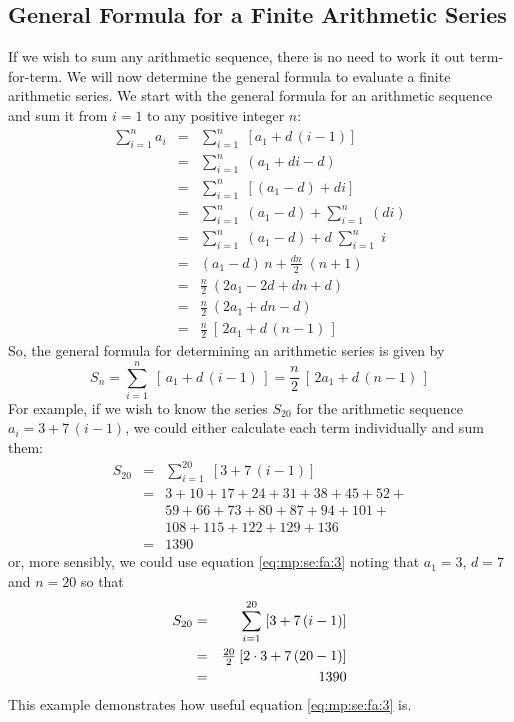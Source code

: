 \subsection{General Formula for a Finite Arithmetic Series}
If we wish to sum any arithmetic sequence, there is no need to work it out term-for-term. We will now determine the general formula to evaluate a finite arithmetic series. We start with the general formula for an arithmetic sequence and sum it from $i=1$ to any positive integer $n$:
\begin{eqnarray*}
\sum_{i=1}^n a_i &=& \sum_{i=1}^n \; [a_1 + d \, (i-1)] \\
&=& \sum_{i=1}^n \; (a_1 + di - d) \\
&=& \sum_{i=1}^n \; [(a_1 - d) + di] \\
&=& \sum_{i=1}^n \; (a_1 - d) + \sum_{i=1}^n \; (di) \\
&=& \sum_{i=1}^n \; (a_1 - d) + d \; \sum_{i=1}^n \; i \\
&=& (a_1 - d) \, n + \frac {dn}{2} \; (n + 1) \\
&=& \frac{n}{2} \: (2a_1 - 2d + dn + d) \\
&=& \frac{n}{2} \: (2a_1 + dn - d) \\
&=& \frac{n}{2} \: [\, 2a_1 + d \, (n - 1) \,]
\end{eqnarray*}
So, the general formula for determining an arithmetic series is given by
\begin{equation}
\label{eq:mp:se:fa:3}
\boxed {S_n = \sum_{i=1}^n \; [\, a_1 + d \, (i-1) \,] = \frac{n}{2} \: [\, 2a_1 + d \, (n - 1) \,]}
\end{equation}
For example, if we wish to know the series $S_{20}$ for the arithmetic sequence $a_i= 3 + 7 \, (i-1)$, we could either calculate each term individually and sum them:
\begin{eqnarray*}
S_{20} &=& \sum_{i=1}^{20} \; [3 + 7 \, (i-1)] \\
&=& 3 + 10 + 17 + 24 + 31 + 38 + 45 + 52 + \\
&& 59 + 66 + 73 + 80 + 87 + 94 + 101 + \\
&& 108 + 115 + 122 + 129 + 136 \\
&=& 1390
\end{eqnarray*}
or, more sensibly, we could use equation \eqref{eq:mp:se:fa:3} noting that $a_1=3$, $d=7$ and $n=20$ so that
\begin{eqnarray*}
\label{eq:mp:se:fa:ex:smartway}
S_{20} &=& \sum_{i=1}^{20} \; [3 + 7 \, (i-1)] \\
&=& \textstyle \small {\frac{20}{2}} \: [2 \cdot 3 + 7 \, (20 - 1) ] \\
&=& 1390
\end{eqnarray*}
This example demonstrates how useful equation \eqref{eq:mp:se:fa:3} is.

